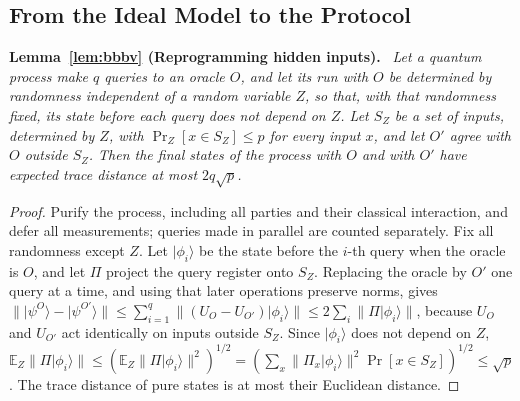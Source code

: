 \documentclass[10pt,journal,compsoc]{IEEEtran}
\theoremstyle{tplain}
\theoremstyle{tdef}
\theoremstyle{remark}
\newenvironment{restate}[1]{\par\smallskip\noindent\textbf{#1.}\ \itshape\ignorespaces}{\par\smallskip}
\begin{document}
\subsection{From the Ideal Model to the Protocol}\label{S-cons-real}

\begin{restate}{Lemma~\ref{lem:bbbv} (Reprogramming hidden inputs)}
Let a quantum process make $q$ queries to an oracle $O$, and let its run with $O$ be determined by randomness independent of a random variable $Z$, so that, with that randomness fixed, its state before each query does not depend on $Z$. Let $S_Z$ be a set of inputs, determined by $Z$, with $\Pr_Z[x\in S_Z]\le p$ for every input $x$, and let $O'$ agree with $O$ outside $S_Z$. Then the final states of the process with $O$ and with $O'$ have expected trace distance at most $2q\sqrt{p}$.
\end{restate}
\begin{proof}
Purify the process, including all parties and their classical interaction, and defer all measurements; queries made in parallel are counted separately. Fix all randomness except $Z$. Let $\lvert\phi_i\rangle$ be the state before the $i$-th query when the oracle is $O$, and let $\Pi$ project the query register onto $S_Z$. Replacing the oracle by $O'$ one query at a time, and using that later operations preserve norms, gives $\|\lvert\psi^{O}\rangle-\lvert\psi^{O'}\rangle\|\le\sum_{i=1}^{q}\|(U_O-U_{O'})\lvert\phi_i\rangle\|\le 2\sum_{i}\|\Pi\lvert\phi_i\rangle\|$, because $U_O$ and $U_{O'}$ act identically on inputs outside $S_Z$. Since $\lvert\phi_i\rangle$ does not depend on $Z$, $\mathbb E_Z\|\Pi\lvert\phi_i\rangle\|\le(\mathbb E_Z\|\Pi\lvert\phi_i\rangle\|^2)^{1/2}=(\sum_x\|\Pi_x\lvert\phi_i\rangle\|^2\Pr[x\in S_Z])^{1/2}\le\sqrt p$. The trace distance of pure states is at most their Euclidean distance.
\end{proof}
\end{document}
